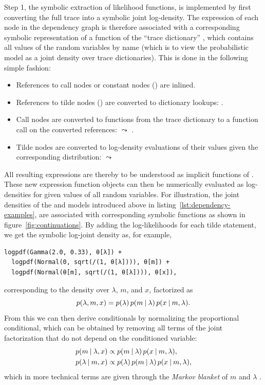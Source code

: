Step 1, the symbolic extraction of likelihood functions, is implemented by first converting the full
trace into a symbolic joint log-density.  The expression of each node in the dependency graph is
therefore associated with a corresponding symbolic representation of a function of the
\enquote{trace dictionary} , which contains all values of the random variables by name
(which is to view the probabilistic model as a joint density over trace dictionaries).  This is done
in the following simple fashion:
\begin{itemize}
  \firmlist
\item References to call nodes or constant nodes () are inlined.
\item References to tilde nodes () are converted to dictionary lookups: .
\item Call nodes are converted to functions from the trace dictionary to a
  function call on the converted references:  \(\leadsto\) .
\item Tilde nodes are converted to log-density evaluations of their values given the corresponding
  distribution:  \(\leadsto\) 
\end{itemize}
All resulting expressions are thereby to be understood as implicit functions of .  These
new expression function objects can then be numerically evaluated as log-densities for given values
of all random variables.  For illustration, the joint densities of the  and
 models introduced above in listing~\ref{lst:dependency-examples}, are
associated with corresponding symbolic functions as shown in figure~\ref{fig:continuations}.  By adding the log-likelihoods for each tilde statement, we get the symbolic
log-joint density as, for example,
\begin{lstlisting}
logpdf(Gamma(2.0, 0.33), θ[λ]) + 
  logpdf(Normal(0, sqrt(/(1, θ[λ]))), θ[m]) + 
  logpdf(Normal(θ[m], sqrt(/(1, θ[λ]))), θ[x]),
\end{lstlisting}
corresponding to the density over \(\lambda\), \(m\), and \(x\), factorized as
\begin{equation}
  p(\lambda, m, x) = p(\lambda) \, p(m \:\vert\: \lambda) \, p(x \:\vert\: m, \lambda).
\end{equation}
From this we can then derive conditionals by normalizing the proportional conditional, which can be
obtained by removing all terms of the joint factorization that do not depend on the conditioned
variable:
\begin{equation}
  \begin{aligned}
    p(m \:\vert\: \lambda, x) &\propto p(m \:\vert\: \lambda) \, p(x \:\vert\: m, \lambda), \\
    p(\lambda \:\vert\: m, x) &\propto p(\lambda) \, p(m \:\vert\: \lambda) \, p(x \:\vert\: m, \lambda),
  \end{aligned}
\end{equation}
which in more technical terms are given through the \emph{Markov blanket} of \(m\) and \(\lambda\)
\parencites[section 24.2]{murphy2012machine}[section 4.5]{koller2009probabilistic}.

